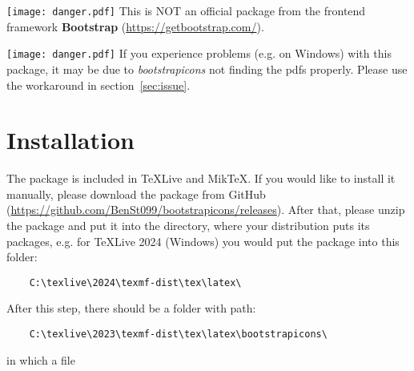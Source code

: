 \documentclass{article}
\begin{document}
\begin{abstract}
\noindent This is the official documentation of the package \textbf{bootstrapicons}. It contains over 2,000 icons from Bootstrap that can be used for all kind of projects.
\end{abstract}\vspace{10mm}

\begin{tcolorbox}[leftrule=3mm,colback=red-200,colframe=red-800,lower separated=false,sidebyside,lefthand width=1.5cm]
    \texttt{[image: danger.pdf]}\tcblower {\bf\textcolor{red-800}{ATTENTION!}} This is NOT an official package from the frontend framework \textbf{Bootstrap} (\href{https://getbootstrap.com/}{\textcolor{blue-700}{https://getbootstrap.com/}}).
\end{tcolorbox}

\begin{tcolorbox}[leftrule=3mm,colback=red-200,colframe=red-800,lower separated=false,sidebyside,lefthand width=1.5cm]
    \texttt{[image: danger.pdf]}\tcblower {\bf\textcolor{red-800}{ATTENTION!}} If you experience problems (e.g. on Windows) with this package, it may be due to \textit{bootstrapicons} not finding the pdfs properly. Please use the workaround in section~\ref{sec:issue}.
\end{tcolorbox}\vspace{10mm}

\newpage

\section{Installation}

The package is included in \TeX Live and Mik\TeX. If you would like to install it manually, please download the package from GitHub (\href{https://github.com/BenSt099/bootstrapicons/releases}{\textcolor{blue-700}{https://github.com/BenSt099/bootstrapicons/releases}}).
After that, please unzip the package and put it into the directory, where your distribution puts its packages, e.g. for \TeX Live 2024 (Windows) you would put the package into this folder:

\begin{verbatim}
    C:\texlive\2024\texmf-dist\tex\latex\
\end{verbatim}

\noindent After this step, there should be a folder with path: 

\begin{verbatim}
    C:\texlive\2023\texmf-dist\tex\latex\bootstrapicons\
\end{verbatim}
in which a file 
\end{document}
